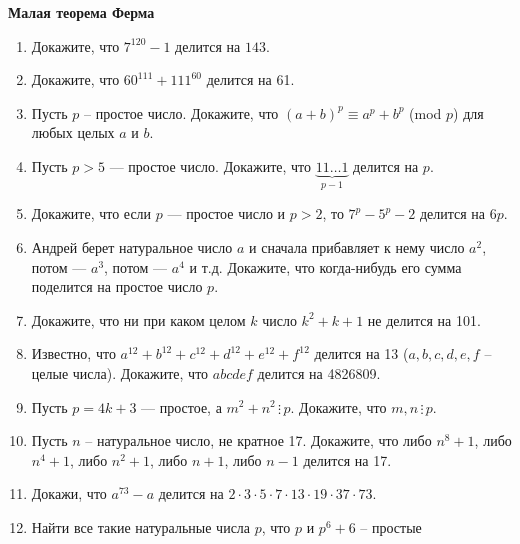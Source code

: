 \documentclass{article}
\begin{document}
\large
	
\begin{center}
	\textbf{Малая теорема Ферма}
\end{center}

\begin{enumerate}[label*=\protect\fbox{\arabic{enumi}}]
	
\item Докажите, что $7^{120} - 1$  делится на $143$.
	
\item Докажите, что $60^{111}+111^{60}$ делится на 61.

\item Пусть $p$ – простое число. Докажите, что  $(a + b)^p \equiv a^p + b^p$ (mod $p$) для любых целых $a$ и $b$.

\item Пусть $p>5$ --- простое число. Докажите, что $\underbrace{11\dots 1}_{p-1}$ делится на $p$.

\item Докажите, что если $p$ --- простое число и $p > 2$, то $7^p - 5^p - 2$ делится на $6p$.

\item Андрей берет натуральное число $a$ и сначала прибавляет к нему число $a^2$, потом --- $a^3$, потом --- $a^4$ и т.д. Докажите, что когда-нибудь его сумма поделится на простое число $p$.

\item Докажите, что ни при каком целом $k$ число $k^2 + k + 1$  не делится на 101.

\item Известно, что  $a^{12} + b^{12} + c^{12} + d^{12} + e^{12} + f^{12}$  делится на 13 ($a, b, c, d, e, f$ – целые числа). Докажите, что $abcdef$ делится на 4826809.

\item Пусть $p = 4k+3$ --- простое, а $m^2 + n^2 \, \vdots \, p$. Докажите, что $m,n \, \vdots \, p$.

\item Пусть $n$ – натуральное число, не кратное 17. Докажите, что либо $n^8 + 1$,  либо $n^4 + 1$,  либо $n^2 + 1$,  либо $n + 1$, либо $n - 1$  делится на 17.

\item Докажи, что $a^{73} - a$  делится на $2\cdot3\cdot5\cdot7\cdot13\cdot19\cdot37\cdot73$.

\item Найти все такие натуральные числа $p$, что $p$ и $p^6 + 6$ – простые


\end{enumerate}
\end{document}
